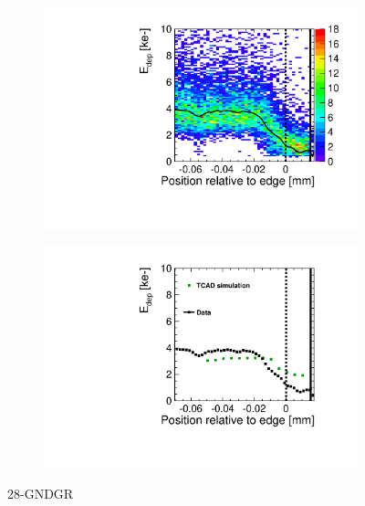 \begin{figure}[htbp]
  \centering
  \begin{subfigure}[b]{0.5\textwidth}
    \includegraphics[width=\textwidth]{figures/ActiveEdge/TCAD_data_Edep_28_GNDGR.pdf}
    \caption{}
  \end{subfigure}\hfill
  \begin{subfigure}[b]{0.5\textwidth}
    \includegraphics[width=\textwidth]{figures/ActiveEdge/TCAD_data_28_GNDGR.pdf}
    \caption{}
  \end{subfigure}
  \caption{28-GNDGR}
  \label{fig:TCAD_vs_data_28_GNDGR}
\end{figure}


